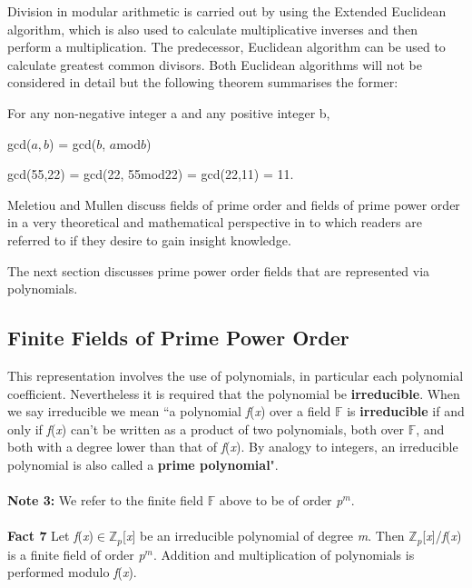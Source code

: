\documentclass[iwp,first]{luthesis}
\begin{document}
Division in modular arithmetic is carried out by using the Extended Euclidean algorithm, which is also used to calculate multiplicative inverses and then perform a multiplication. The predecessor, Euclidean algorithm can be used to calculate greatest common divisors. Both Euclidean algorithms will not be considered in detail but the following theorem summarises the former:

\begin{theorem}
For any non-negative integer a and any positive integer b,
\end{theorem}

\begin{center}
gcd($a,b$) = gcd($b$, $a$mod$b$)
\end{center}

\begin{example}
gcd(55,22) = gcd(22, 55mod22) = gcd(22,11) = 11.
\end{example}

Meletiou and Mullen discuss fields of prime order and fields of prime power order in a very theoretical and mathematical perspective in \cite{NDL} to which readers are referred to if they desire to gain insight knowledge.

The next section discusses prime power order fields that are represented via polynomials.

\subsection{Finite Fields of Prime Power Order}

This representation involves the use of polynomials, in particular each polynomial coefficient. Nevertheless it is required that the polynomial be \textbf{irreducible}. When we say irreducible we mean ``a polynomial \textit{f}(\textit{x}) over a field $\mathbb{F}$ is \textbf{irreducible} if and only if \textit{f}(\textit{x}) can't be written as a product of two polynomials, both over $\mathbb{F}$, and both with a degree lower than that of \textit{f}(\textit{x}). By analogy to integers, an irreducible polynomial is also called a \textbf{prime polynomial}".
\\
\\
\textbf{Note 3:} We refer to the finite field $\mathbb{F}$ above to be of order \textit{p$^m$}.
\\
\\
\textbf{Fact 7} Let \textit{f}(\textit{x})$\in\mathbb{Z}_p$[\textit{x}] be an irreducible polynomial of degree \textit{m}. Then $\mathbb{Z}_p$[\textit{x}]/\textit{f}(\textit{x}) is a finite field of order \textit{p$^m$}. Addition and multiplication of polynomials is performed modulo \textit{f}(\textit{x}).
\end{document}
